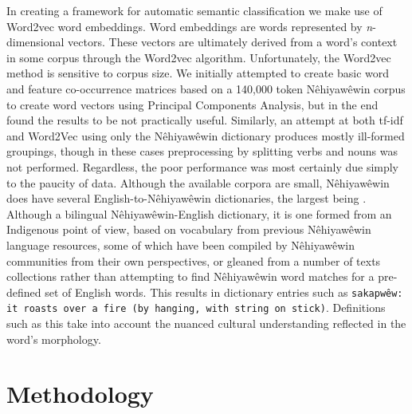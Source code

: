 In creating a framework for automatic semantic classification we make use of Word2vec \citep{mikolov2013efficient} word embeddings. Word embeddings are words represented by \textit{n}-dimensional vectors. These vectors are ultimately derived from a word's context in some corpus through the Word2vec algorithm. Unfortunately, the Word2vec method is sensitive to corpus size. We initially attempted to create basic word and feature co-occurrence matrices based on a 140,000 token Nêhiyawêwin corpus \cite{arppe1945morphosyntactically} to create word vectors using Principal Components Analysis, but in the end found the results to be not practically useful. Similarly, an attempt at both tf-idf and Word2Vec using only the Nêhiyawêwin dictionary produces mostly ill-formed groupings, though in these cases preprocessing by splitting verbs and nouns was not performed. Regardless, the poor performance was most certainly due simply to the paucity of data. Although the available corpora are small, Nêhiyawêwin does have several English-to-Nêhiyawêwin dictionaries, the largest being \citet{Wolvengrey2001}. Although a bilingual Nêhiyawêwin-English dictionary, it is one formed from an Indigenous point of view, based on vocabulary from previous Nêhiyawêwin language resources, some of which have been compiled by Nêhiyawêwin communities from their own perspectives, or gleaned from a number of texts collections rather than attempting to find Nêhiyawêwin word matches for a pre-defined set of English words. This results in dictionary entries such as \texttt{sakapwêw: it roasts over a fire (by hanging, with string on stick)}. Definitions such as this take into account the nuanced cultural understanding reflected in the word's morphology. 

\section{Methodology}

